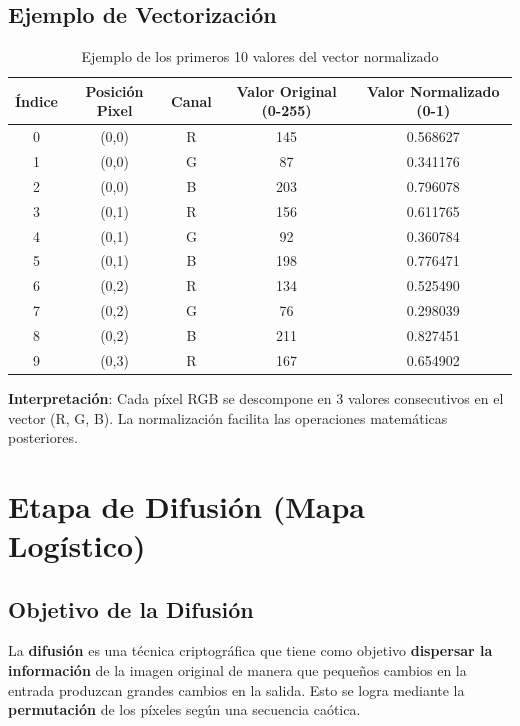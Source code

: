 \documentclass[12pt,a4paper]{article}
\begin{document}
	\subsection{Ejemplo de Vectorización}
	
	\begin{table}[H]
		\centering
		\caption{Ejemplo de los primeros 10 valores del vector normalizado}
		\label{tab:vectorizacion}
		\begin{tabular}{@{}ccccc@{}}
			\toprule
			\textbf{Índice} & \textbf{Posición Pixel} & \textbf{Canal} & \textbf{Valor Original (0-255)} & \textbf{Valor Normalizado (0-1)} \\ \midrule
			0 & (0,0) & R & 145 & 0.568627 \\
			1 & (0,0) & G & 87 & 0.341176 \\
			2 & (0,0) & B & 203 & 0.796078 \\
			3 & (0,1) & R & 156 & 0.611765 \\
			4 & (0,1) & G & 92 & 0.360784 \\
			5 & (0,1) & B & 198 & 0.776471 \\
			6 & (0,2) & R & 134 & 0.525490 \\
			7 & (0,2) & G & 76 & 0.298039 \\
			8 & (0,2) & B & 211 & 0.827451 \\
			9 & (0,3) & R & 167 & 0.654902 \\ \bottomrule
		\end{tabular}
	\end{table}
	
	\textbf{Interpretación}: Cada píxel RGB se descompone en 3 valores consecutivos en el vector (R, G, B). La normalización facilita las operaciones matemáticas posteriores.
	
	\section{Etapa de Difusión (Mapa Logístico)}
	
	\subsection{Objetivo de la Difusión}
	
	La \textbf{difusión} es una técnica criptográfica que tiene como objetivo \textbf{dispersar la información} de la imagen original de manera que pequeños cambios en la entrada produzcan grandes cambios en la salida. Esto se logra mediante la \textbf{permutación} de los píxeles según una secuencia caótica.
	
\end{document}
